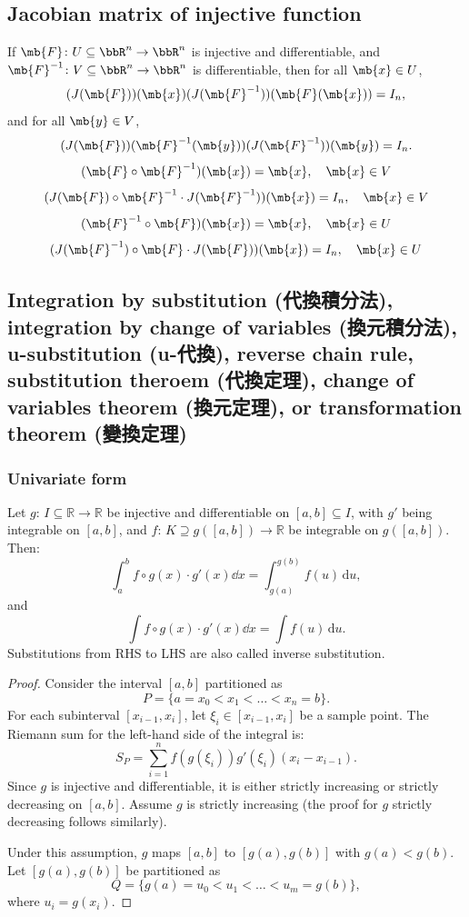 \documentclass[a4paper,12pt]{report}
\begin{document}
\begin{itemize}
\begin{itemize}
\subsection{Jacobian matrix of injective function}
If $\mb{F}\colon U\subseteq\bbR^n\to\bbR^n$ is injective and differentiable, and $\mb{F}^{-1}\colon V\subseteq\bbR^n\to\bbR^n$ is differentiable, then for all $\mb{x}\in U$,
\[(J(\mb{F}))(\mb{x})(J(\mb{F}^{-1}))(\mb{F}(\mb{x}))=I_n,\]
and for all $\mb{y}\in V$,
\[(J(\mb{F}))(\mb{F}^{-1}(\mb{y}))(J(\mb{F}^{-1}))(\mb{y})=I_n.\]
\bpr
\[(\mb{F}\circ\mb{F}^{-1})(\mb{x})=\mb{x},\quad\mb{x}\in V\]
\[(J(\mb{F})\circ\mb{F}^{-1}\cdot J(\mb{F}^{-1}))(\mb{x})=I_n,\quad\mb{x}\in V\]
\[(\mb{F}^{-1}\circ\mb{F})(\mb{x})=\mb{x},\quad\mb{x}\in U\]
\[(J(\mb{F}^{-1})\circ\mb{F}\cdot J(\mb{F}))(\mb{x})=I_n,\quad\mb{x}\in U\]
\epr
\subsection{Integration by substitution (代換積分法), integration by change of variables (換元積分法), u-substitution (u-代換), reverse chain rule, substitution theroem (代換定理), change of variables theorem (換元定理), or transformation theorem (變換定理)}
\subsubsection{Univariate form}
Let $g:\,I\subseteq\mathbb{R}\to\mathbb{R}$ be injective and differentiable on $[a,b]\subseteq I$, with $g'$ being integrable on $[a,b]$, and $f:\,K\supseteq g([a,b])\to\mathbb{R}$ be integrable on $g([a,b])$. Then:
\[\int_a^bf\circ g(x)\cdot g'(x)\dd{x}=\int_{g(a)}^{g(b)}f(u)\,\mathrm{d}u,\]
and
\[\int f\circ g(x)\cdot g'(x)\dd{x}=\int f(u)\,\mathrm{d}u.\]
Substitutions from RHS to LHS are also called inverse substitution.
\begin{proof}
Consider the interval \([a, b]\) partitioned as
\[P = \{a = x_0 < x_1 < \dots  < x_n = b\}.\]
For each subinterval \([x_{i-1}, x_i]\), let \(\xi_i \in [x_{i-1}, x_i]\) be a sample point. The Riemann sum for the left-hand side of the integral is:
\[S_P = \sum_{i=1}^n f(g(\xi_i)) g'(\xi_i) (x_i - x_{i-1}).\]
Since \(g\) is injective and differentiable, it is either strictly increasing or strictly decreasing on \([a, b]\). Assume \(g\) is strictly increasing (the proof for \(g\) strictly decreasing follows similarly).

Under this assumption, \(g\) maps \([a, b]\) to \([g(a), g(b)]\) with \(g(a) < g(b)\). Let \([g(a), g(b)]\) be partitioned as
\[Q = \{g(a) = u_0 < u_1 < \dots  < u_m = g(b)\},\]
where \(u_i = g(x_i)\).


\end{proof}
\end{itemize}
\end{itemize}
\end{document}
